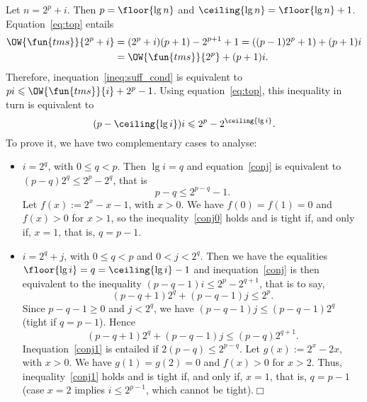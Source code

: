 Let \(n = 2^p + i\). Then \(p = \floor{\lg n}\) and \(\ceiling{\lg n}
= \floor{\lg n} + 1\). Equation~\eqref{eq:top} 
entails
\begin{align*}
\OW{\fun{tms}}{2^p+i} &=
(2^p+i)(p+1)-2^{p+1}+1 = ((p-1)2^p+1)+(p+1)i\\
&= \OW{\fun{tms}}{2^p} + (p+1)i.
\end{align*}
Therefore, inequation~\eqref{ineq:suff_cond} is equivalent to \(pi
\leqslant \OW{\fun{tms}}{i} + 2^p - 1\). Using
equation~\eqref{eq:top}, this inequality in turn is equivalent to
\begin{equation}
(p - \ceiling{\lg i})i \leqslant 2^p - 2^{\ceiling{\lg i}}.
\label{conj}
\end{equation}
To prove it, we have two complementary cases to analyse:
\begin{itemize}

  \item \(i=2^q\), with \(0 \leqslant q < p\). Then \(\lg i = q\) and
    equation~\eqref{conj} is equivalent to \((p-q)2^q \leqslant 2^p -
    2^q\), that is
    \begin{equation}
      p-q \leqslant 2^{p-q} - 1.\label{conj0}
    \end{equation}
    Let \(f(x) := 2^x - x - 1\), with \(x > 0\). We have \(f(0) = f(1)
    = 0\) and \(f(x) > 0\) for \(x>1\), so the
    inequality~\eqref{conj0} holds and is tight if, and only if,
    \(x=1\), that is, \(q=p-1\).

  \item \(i = 2^q + j\), with \(0 \leqslant q < p\) and \(0 < j <
    2^q\). Then we have the equalities \(\floor{\lg i} = q =
    \ceiling{\lg i} - 1\) and inequation~\eqref{conj} is then
    equivalent to the inequality \((p-q-1)i \leqslant 2^p - 2^{q+1}\),
    that is to say,
    \begin{equation}
      (p-q+1)2^q + (p-q-1)j \leqslant 2^p.\label{conj1}
    \end{equation}
    Since \(p-q-1 \geqslant 0\) and \(j < 2^q\), we have \((p-q-1)j
    \leqslant (p-q-1)2^q\) (tight if \(q=p-1\)). Hence
    \begin{equation*}
      (p-q+1)2^q+(p-q-1)j \leqslant (p-q)2^{q+1}.
    \end{equation*}
    Inequation~\eqref{conj1} is entailed if \(2(p-q)
    \leqslant 2^{p-q}\). Let \(g(x) := 2^x - 2x\), with \(x > 0\). We
    have \(g(1) = g(2) = 0\) and \(f(x) > 0\) for \(x > 2\). Thus,
    inequality~\eqref{conj1} holds and is tight if, and only if,
    \(x=1\), that is, \(q=p-1\) (case \(x=2\) implies \(i
    \leqslant 2^{p-1}\), which cannot be tight).\hfill\(\Box\)

\end{itemize}

